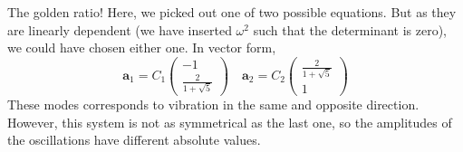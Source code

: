 \documentclass{article}
\begin{document}
        The golden ratio! Here, we picked out one of two possible equations. But as they are linearly dependent (we have inserted $\omega^2$ such that the determinant is zero), we could have chosen either one. In vector form, 
        \begin{equation*}
            \mathbf{a}_1= C_1
            \begin{pmatrix*}
                -1 \\
                \frac{2}{1 + \sqrt 5}
            \end{pmatrix*}
            \quad
            \mathbf{a}_2= C_2
            \begin{pmatrix*}
                \frac{2}{1 + \sqrt 5} \\
                1
            \end{pmatrix*}
        \end{equation*}
        These modes corresponds to vibration in the same and opposite direction. However, this system is not as symmetrical as the last one, so the amplitudes of the oscillations have different absolute values. 
\end{document}
